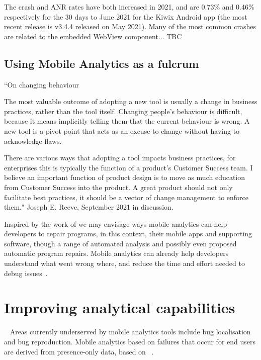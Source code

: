 The crash and ANR rates have both increased in 2021, and are 0.73\% and 0.46\% respectively for the 30 days to  June 2021 for the Kiwix Android app (the most recent release is v3.4.4 released on  May 2021). Many of the most common crashes are related to the embedded WebView component... TBC

\afterpage{\clearpage}
\subsection{Using Mobile Analytics as a fulcrum}
\begin{mdframed}

``On changing behaviour

The most valuable outcome of adopting a new tool is usually a change in business practices, rather than the tool itself.
Changing people’s behaviour is difficult, because it means implicitly telling them that the current behaviour is wrong. A new tool is a pivot point that acts as an excuse to change without having to acknowledge flaws.

There are various ways that adopting a tool impacts business practices, for enterprises this is typically the function of a product’s Customer Success team. I believe an important function of product design is to move as much education from Customer Success into the product. A great product should not only facilitate best practices, it should be a vector of change management to enforce them." Joseph E. Reeve,  September 2021 in discussion.
\end{mdframed}

Inspired by the work of  we may envisage ways mobile analytics can help developers to repair programs, in this context, their mobile apps and supporting software, though a range of automated analysis and possibly even proposed automatic program repairs. Mobile analytics can already help developers understand what went wrong where, and reduce the time and effort needed to debug issues~.

\section{Improving analytical capabilities}~\label{discussion-improving-mobile-analytics}
Areas currently underserved by mobile analytics tools include bug localisation and bug reproduction. Mobile analytics based on failures that occur for end users are derived from presence-only data, based on ~. 


